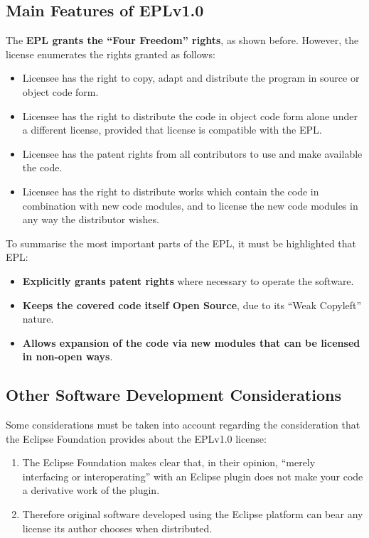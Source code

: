 \documentclass[a4paper, 12pt]{book}
\begin{document}
\subsection{Main Features of EPLv1.0}
The \textbf{EPL grants the ``Four Freedom'' rights}, as shown before. However, the license enumerates the rights granted as follows:
\begin{itemize}\itemsep0pt
 \item{Licensee has the right to copy, adapt and distribute the program in source or object code form}.
 \item{Licensee has the right to distribute the code in object code form alone under a different license, provided that license is compatible with the EPL}.
 \item{Licensee has the patent rights from all contributors to use and make available the code}.
  \item{Licensee has the right to distribute works which contain the code in combination with new code modules, and to license the new code modules in any way the distributor wishes}.
\end{itemize}

To summarise the most important parts of the EPL, it must be highlighted that EPL:
\begin{itemize}\itemsep0pt
 \item{\textbf{Explicitly grants patent rights} where necessary to operate the software}.
 \item{\textbf{Keeps the covered code itself Open Source}}, due to its ``Weak Copyleft'' nature.
 \item{\textbf{Allows expansion of the code via new modules that can be licensed in non-open ways}}.
\end{itemize}\itemsep0pt

\subsection{Other Software Development Considerations}
Some considerations must be taken into account regarding the consideration that the Eclipse Foundation provides about the EPLv1.0 license:
\begin{enumerate}
 \item{The Eclipse Foundation makes clear that, in their opinion, ``merely interfacing or interoperating'' with an Eclipse plugin does not make your code a derivative work of the plugin}.
 \item{Therefore original software developed using the Eclipse platform can bear any license its author chooses when distributed}.
\end{enumerate}
\end{document}

